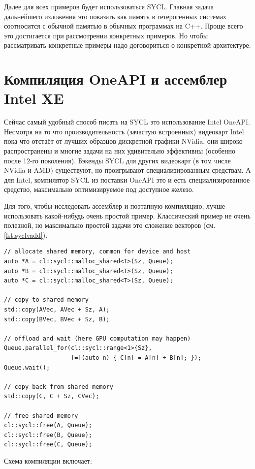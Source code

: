 \documentclass[a4paper,12pt,oneside]{article}
\begin{document}
Далее для всех примеров будет использоваться SYCL.
Главная задача дальнейшего изложения это показать как память в гетерогенных системах соотносится с обычной памятью в обычных программах на C++.
Проще всего это достигается при рассмотрении конкретных примеров.
Но чтобы рассматривать конкретные примеры надо договориться о конкретной архитектуре.

\pagebreak
\section{Компиляция OneAPI и ассемблер Intel XE}\label{sec:IntelXE}

Сейчас самый удобный способ писать на SYCL это использование Intel OneAPI.
Несмотря на то что производительность (зачастую встроенных) видеокарт Intel пока что отстаёт от лучших образцов дискретной графики NVidia, они широко распространены и многие задачи на них удивительно эффективны (особенно после 12-го поколения).
Бэкенды SYCL для других видеокарт (в том числе NVidia и AMD) существуют, но проигрывают специализированным средствам.
А для Intel, компилятор SYCL из поставки OneAPI это и есть специализированное средство, максимально оптимизируемое под доступное железо.

Для того, чтобы исследовать ассемблер и поэтапную компиляцию, лучше использовать какой-нибудь очень простой пример.
Классический пример не очень полезной, но максимально простой задачи это сложение векторов (см. \ref{lst:syclvadd}).

\begin{lstlisting}[caption={Сложение векторов на SYCL},label={lst:syclvadd}]
// allocate shared memory, common for device and host
auto *A = cl::sycl::malloc_shared<T>(Sz, Queue);
auto *B = cl::sycl::malloc_shared<T>(Sz, Queue);
auto *C = cl::sycl::malloc_shared<T>(Sz, Queue);

// copy to shared memory
std::copy(AVec, AVec + Sz, A);
std::copy(BVec, BVec + Sz, B);

// offload and wait (here GPU computation may happen)
Queue.parallel_for(cl::sycl::range<1>{Sz},
                   [=](auto n) { C[n] = A[n] + B[n]; });
Queue.wait();

// copy back from shared memory
std::copy(C, C + Sz, CVec);

// free shared memory 
cl::sycl::free(A, Queue);
cl::sycl::free(B, Queue);
cl::sycl::free(C, Queue);
\end{lstlisting}

Схема компиляции включает:
\end{document}
